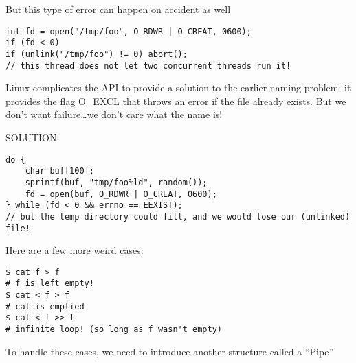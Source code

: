 \documentclass[../../lecture_notes.tex]{subfiles}
\begin{document}
But this type of error can happen on accident as well
\begin{lstlisting}
int fd = open("/tmp/foo", O_RDWR | O_CREAT, 0600);
if (fd < 0) 
if (unlink("/tmp/foo") != 0) abort();
// this thread does not let two concurrent threads run it!
\end{lstlisting}

Linux complicates the API to provide a solution to the earlier naming problem; it provides the flag O\_EXCL that throws an error if the file already exists. But we don’t want failure…we don’t care what the name is!

SOLUTION:
\begin{lstlisting}
do {
	char buf[100];
	sprintf(buf, "tmp/foo%ld", random());
	fd = open(buf, O_RDWR | O_CREAT, 0600);
} while (fd < 0 && errno == EEXIST);
// but the temp directory could fill, and we would lose our (unlinked) file!
\end{lstlisting}

Here are a few more weird cases:
\begin{lstlisting}
$ cat f > f
# f is left empty!
$ cat < f > f
# cat is emptied
$ cat < f >> f
# infinite loop! (so long as f wasn't empty)
\end{lstlisting}

To handle these cases, we need to introduce another structure called a “Pipe”
\end{document}
